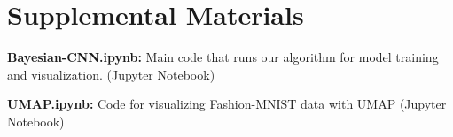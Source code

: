 \newpage

\section*{Supplemental Materials}

\textbf{Bayesian-CNN.ipynb:} Main code that runs our algorithm for model training and visualization. (Jupyter Notebook)

\medskip

\textbf{UMAP.ipynb:} Code for visualizing Fashion-MNIST data with UMAP (Jupyter Notebook)